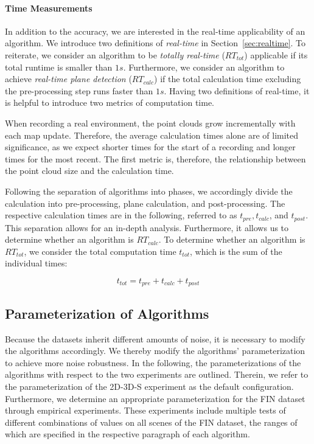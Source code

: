 \documentclass[main.tex]{subfiles}
\begin{document}
\paragraph{Time Measurements}
\label{par:time}
In addition to the accuracy, we are interested in the real-time applicability of an algorithm. We introduce two definitions
of \textit{real-time} in Section~\ref{sec:realtime}.
To reiterate, we consider an algorithm to be \textit{totally real-time} ($RT_{tot}$) applicable if its total runtime is smaller than $1s$.
Furthermore, we consider an algorithm to achieve \textit{real-time plane detection} ($RT_{calc}$) if the total calculation time
excluding the pre-processing step runs faster than $1s.$ 
Having two definitions of real-time, it is helpful to introduce two metrics of computation time.

When recording a real environment, the point clouds grow incrementally with each map update.
Therefore, the average calculation times alone are of limited significance, as we expect shorter times for the start of a recording
and longer times for the most recent. The first metric is, therefore, the relationship between the point cloud size and the calculation time.

Following the separation of algorithms into phases, we accordingly divide the calculation into pre-processing, plane calculation, and post-processing.
The respective calculation times are in the following, referred to as $t_{pre}, t_{calc}$, and $t_{post}$.
This separation allows for an in-depth analysis. Furthermore, it allows us to determine
whether an algorithm is $RT_{calc}$. To determine whether an algorithm is $RT_{tot}$, we consider the
total computation time $t_{tot}$, which is the sum of the individual times:

\begin{equation}
    t_{tot} = t_{pre} + t_{calc} + t_{post}
\end{equation}


\subsection{Parameterization of Algorithms}
Because the datasets inherit different amounts of noise, it is necessary to modify the algorithms accordingly.
We thereby modify the algorithms' parameterization to achieve more noise robustness.
In the following, the parameterizations of the algorithms with respect to the two experiments are outlined.
Therein, we refer to the parameterization of the 2D-3D-S experiment as the default configuration.
Furthermore, we determine an appropriate parameterization for the FIN dataset through
empirical experiments. These experiments include multiple tests of different combinations of values on all scenes of the FIN dataset,
the ranges of which are specified in the respective paragraph of each algorithm.
\end{document}
